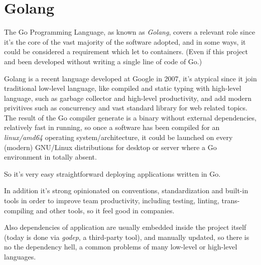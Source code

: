 \chapter{Golang}\label{golang}

The Go Programming Language, as known as \emph{Golang}, covers a
relevant role since it's the core of the vast majority of the software
adopted, and in some ways, it could be considered a requirement which
let to containers. (Even if this project and been developed without
writing a single line of code of Go.)

Golang is a recent language developed at Google in 2007, it's atypical
since it join traditional low-level language, like compiled and static
typing with high-level language, such as garbage collector and
high-level productivity, and add modern privitives such as concurrency
and vast standard library for web related topics. The result of the Go
compiler generate is a binary without external dependencies, relatively
fast in running, so once a software has been compiled for an
\emph{linux/amd64} operating system/architecture, it could be launched
on every (modern) GNU/Linux distributions for desktop or server where a
Go environment in totally absent.

So it's very easy straightforward deploying applications written in Go.

In addition it's strong opinionated on conventions, standardization and
built-in tools in order to improve team productivity, including testing,
linting, trans-compiling and other tools, so it feel good in companies.

Also dependencies of application are usually embedded inside the project
itself (today is done via \emph{godep}, a third-party tool), and
manually updated, so there is no the dependency hell, a common problems
of many low-level or high-level languages.